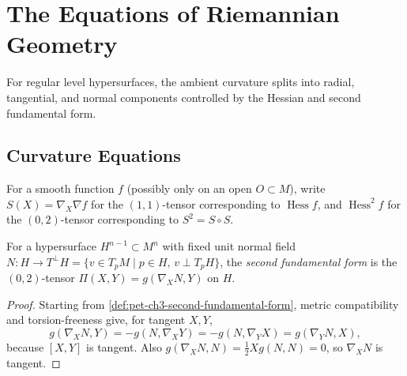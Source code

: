 \section{The Equations of Riemannian Geometry}

For regular level hypersurfaces, the ambient curvature splits into radial,
tangential, and normal components controlled by the Hessian and second
fundamental form.

\subsection{Curvature Equations}

\begin{definition}
  \label{def:pet-ch3-hessian-square-notation}
  \leanok
  For a smooth function $f$ (possibly only on an open $O\subset M$), write
  $S(X)=\nabla_X\nabla f$ for the $(1,1)$-tensor corresponding to
  $\operatorname{Hess}f$, and $\operatorname{Hess}^2f$ for the $(0,2)$-tensor
  corresponding to $S^2=S\circ S$.
\end{definition}

\begin{definition}
  \label{def:pet-ch3-second-fundamental-form}
  \leanok
  For a hypersurface $H^{n-1}\subset M^n$ with fixed unit normal field
  $N:H\to T^\perp H=\{v\in T_pM\mid p\in H,\,v\perp T_pH\}$, the \emph{second
  fundamental form} is the $(0,2)$-tensor $\Pi(X,Y)=g(\nabla_XN,Y)$ on $H$.
\end{definition}
\begin{proof}
  \leanok
  \sketch
  Starting from \cref{def:pet-ch3-second-fundamental-form}, metric compatibility
  and torsion-freeness give, for tangent $X,Y$,
  \[
   g(\nabla_XN,Y)=-g(N,\nabla_XY)
   =-g(N,\nabla_YX)=g(\nabla_YN,X),
  \]
  because $[X,Y]$ is tangent. Also
  $g(\nabla_XN,N)=\tfrac12Xg(N,N)=0$, so $\nabla_XN$ is tangent.
\end{proof}

